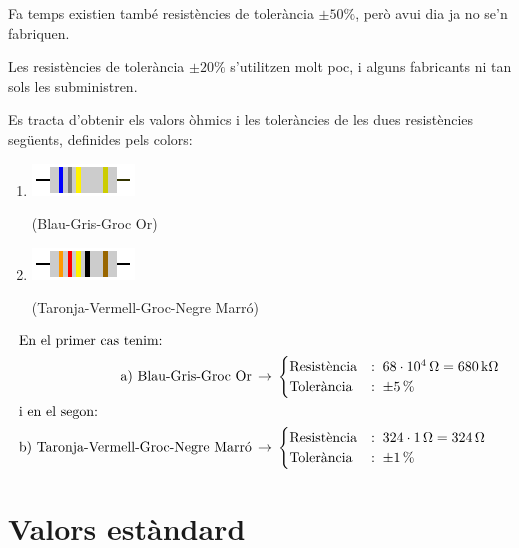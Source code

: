 Fa temps existien tamb\'{e} resist\`{e}ncies de toler\`{a}ncia $\pm50\unit{\%}$,
per\`{o} avui dia ja no se'n fabriquen.

Les resist\`{e}ncies de toler\`{a}ncia $\pm20\unit{\%}$ s'utilitzen molt poc, i alguns fabricants
ni tan sols les subministren.

\begin{exemple}
   Es tracta d'obtenir els valors \`{o}hmics i les toler\`{a}ncies de les dues resist\`{e}ncies seg\"{u}ents,
   definides pels colors:
\begin{enumerate}
   \renewcommand{\labelenumi}{\alph{enumi})}
   \item \begin{minipage}{1.8cm}
           \includegraphics{Imatges/Cap-Resistencies-R1.pdf}
        \end{minipage} (Blau-Gris-Groc Or)
   \item  \begin{minipage}{1.8cm}
           \includegraphics{Imatges/Cap-Resistencies-R2.pdf}
        \end{minipage} (Taronja-Vermell-Groc-Negre Marr\'{o})
\end{enumerate}
\begin{align*}
   \intertext{En el primer cas tenim:}
   \text{a) Blau-Gris-Groc Or}\,  &\rightarrow\,
   \begin{cases}
      \text{Resist\`{e}ncia} &:\; 68\cdot10^4\mathrm{\,\mathrm{\Omega}} = 680\mathrm{\,k\mathrm{\Omega}} \\
      \text{Toler\`{a}ncia}  &:\; \pm5\mathrm{\,\%}
   \end{cases} \\
   \intertext{i en el segon:}
   \text{b) Taronja-Vermell-Groc-Negre Marr\'{o}}\,  &\rightarrow\,
   \begin{cases}
      \text{Resist\`{e}ncia} &:\; 324\cdot1\mathrm{\,\mathrm{\Omega}} = 324\mathrm{\,\mathrm{\Omega}} \\
      \text{Toler\`{a}ncia}  &:\; \pm1\mathrm{\,\%}
   \end{cases}
\end{align*}
\end{exemple}

\section{Valors est\`{a}ndard} 

